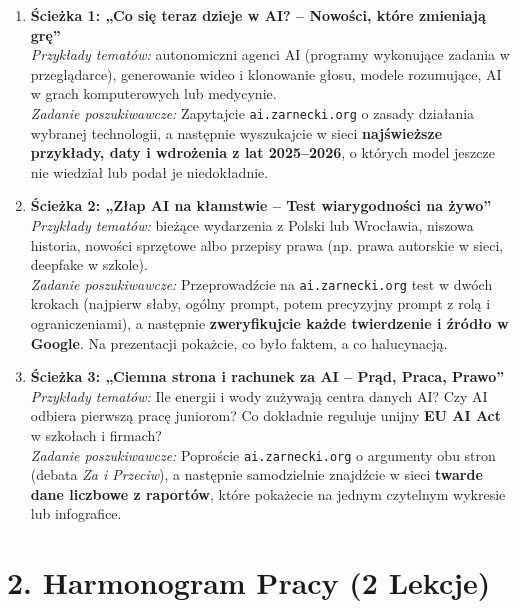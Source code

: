 \documentclass[11pt,a4paper]{article}
\begin{document}
\begin{enumerate}
    \item \textbf{Ścieżka 1: „Co się teraz dzieje w AI? -- Nowości, które zmieniają grę”}\\
    \emph{Przykłady tematów:} autonomiczni agenci AI (programy wykonujące zadania w przeglądarce), generowanie wideo i klonowanie głosu, modele rozumujące, AI w grach komputerowych lub medycynie.\\
    \emph{Zadanie poszukiwawcze:} Zapytajcie \texttt{ai.zarnecki.org} o zasady działania wybranej technologii, a następnie wyszukajcie w sieci \textbf{najświeższe przykłady, daty i wdrożenia z lat 2025--2026}, o których model jeszcze nie wiedział lub podał je niedokładnie.

    \item \textbf{Ścieżka 2: „Złap AI na kłamstwie -- Test wiarygodności na żywo”}\\
    \emph{Przykłady tematów:} bieżące wydarzenia z Polski lub Wrocławia, niszowa historia, nowości sprzętowe albo przepisy prawa (np. prawa autorskie w sieci, deepfake w szkole).\\
    \emph{Zadanie poszukiwawcze:} Przeprowadźcie na \texttt{ai.zarnecki.org} test w dwóch krokach (najpierw słaby, ogólny prompt, potem precyzyjny prompt z rolą i ograniczeniami), a następnie \textbf{zweryfikujcie każde twierdzenie i źródło w Google}. Na prezentacji pokażcie, co było faktem, a co halucynacją.

    \item \textbf{Ścieżka 3: „Ciemna strona i rachunek za AI -- Prąd, Praca, Prawo”}\\
    \emph{Przykłady tematów:} Ile energii i wody zużywają centra danych AI? Czy AI odbiera pierwszą pracę juniorom? Co dokładnie reguluje unijny \textbf{EU AI Act} w szkołach i firmach?\\
    \emph{Zadanie poszukiwawcze:} Poproście \texttt{ai.zarnecki.org} o argumenty obu stron (debata \emph{Za i Przeciw}), a następnie samodzielnie znajdźcie w sieci \textbf{twarde dane liczbowe z raportów}, które pokażecie na jednym czytelnym wykresie lub infografice.
\end{enumerate}

\section{2. Harmonogram Pracy (2 Lekcje)}
\end{document}
